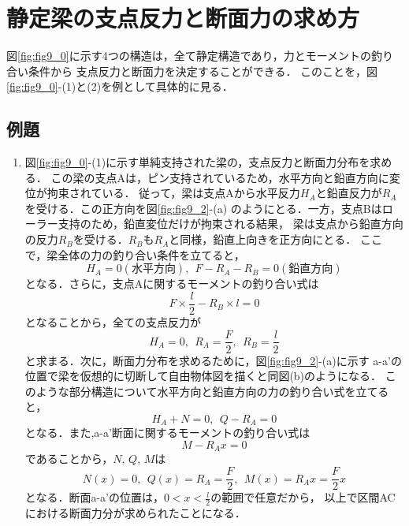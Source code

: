 \documentclass[10pt,a4j]{jarticle}
\begin{document}
\section{静定梁の支点反力と断面力の求め方}
図\ref{fig:fig9_0}に示す4つの構造は，全て静定構造であり，力とモーメントの釣り合い条件から
支点反力と断面力を決定することができる．
このことを，図\ref{fig:fig9_0}-(1)と(2)を例として具体的に見る．
\subsection{例題}
\begin{enumerate}
\item
図\ref{fig:fig9_0}-(1)に示す単純支持された梁の，支点反力と断面力分布を求める．
この梁の支点Aは，ピン支持されているため，水平方向と鉛直方向に変位が拘束されている．
従って，梁は支点Aから水平反力$H_A$と鉛直反力が$R_A$を受ける．この正方向を図\ref{fig:fig9_2}-(a)
のようにとる．一方，支点Bはローラー支持のため，鉛直変位だけが拘束される結果，
梁は支点から鉛直方向の反力$R_B$を受ける．$R_B$も$R_A$と同様，鉛直上向きを正方向にとる．
ここで，梁全体の力の釣り合い条件を立てると，
\begin{equation}
	H_A=0(水平方向), \ \ 
	F-R_A-R_B=0(鉛直方向)
	\label{eqn:}
\end{equation}
となる．さらに，支点Aに関するモーメントの釣り合い式は
\begin{equation}
	F\times \frac{l}{2}-R_B\times l =0
	\label{eqn:}
\end{equation}
となることから，全ての支点反力が
\begin{equation}
	H_A=0, \ \ R_A=\frac{F}{2}, \ \ R_B=\frac{l}{2}
	\label{eqn:}
\end{equation}
と求まる．次に，断面力分布を求めるために，図\ref{fig:fig9_2}-(a)に示す
a-a'の位置で梁を仮想的に切断して自由物体図を描くと同図(b)のようになる．
このような部分構造について水平方向と鉛直方向の力の釣り合い式を立てると，
\begin{equation}
	H_A+N=0, \ \ Q-R_A=0
	\label{eqn:}
\end{equation}
となる．また,a-a'断面に関するモーメントの釣り合い式は
\begin{equation}
	M-R_A x=0
	\label{eqn:}
\end{equation}
であることから，$N,\, Q,\, M$は
\begin{equation}
	N(x)=0,\ \ Q(x)=R_A=\frac{F}{2}, \ \ 
	M(x)= R_Ax =\frac{F}{2}x
	\label{eqn:}
\end{equation}
となる．断面a-a'の位置は，$0< x< \frac{l}{2}$の範囲で任意だから，
以上で区間ACにおける断面力分が求められたことになる．

\end{enumerate}
\end{document}
